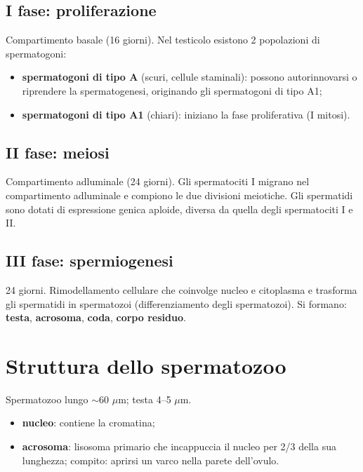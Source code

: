\subsection{I fase: proliferazione}
Compartimento basale (16 giorni). Nel testicolo esistono 2 popolazioni di spermatogoni:
\begin{itemize}
  \item \textbf{spermatogoni di tipo A} (scuri, cellule staminali): possono autorinnovarsi o
    riprendere la spermatogenesi, originando gli spermatogoni di tipo A1;
  \item \textbf{spermatogoni di tipo A1} (chiari): iniziano la fase proliferativa (I mitosi).
\end{itemize}

\subsection{II fase: meiosi}
Compartimento adluminale (24 giorni). Gli spermatociti I migrano nel compartimento adluminale e
compiono le due divisioni meiotiche. Gli spermatidi sono dotati di espressione genica aploide,
diversa da quella degli spermatociti I e II.

\subsection{III fase: spermiogenesi}
24 giorni. Rimodellamento cellulare che coinvolge nucleo e citoplasma e trasforma gli spermatidi
in spermatozoi (differenziamento degli spermatozoi). Si formano: \textbf{testa}, \textbf{acrosoma},
\textbf{coda}, \textbf{corpo residuo}.

\section{Struttura dello spermatozoo}

Spermatozoo lungo $\sim$60 $\mu$m; testa 4--5 $\mu$m.

\begin{itemize}
  \item \textbf{nucleo}: contiene la cromatina;
  \item \textbf{acrosoma}: lisosoma primario che incappuccia il nucleo per 2/3 della sua
    lunghezza; compito: aprirsi un varco nella parete dell'ovulo.
\end{itemize}

